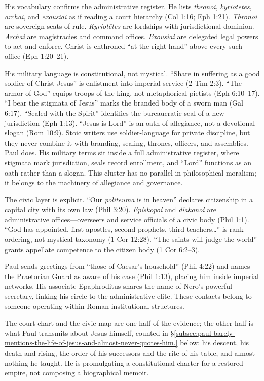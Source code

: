 His vocabulary confirms the administrative register.
He lists \textit{thronoi}, \textit{kyriotētes}, \textit{archai}, and \textit{exousiai} as if reading a court hierarchy (Col 1:16; Eph 1:21).
\textit{Thronoi} are sovereign seats of rule.
\textit{Kyriotētes} are lordships with jurisdictional dominion.
\textit{Archai} are magistracies and command offices.
\textit{Exousiai} are delegated legal powers to act and enforce.
Christ is enthroned ``at the right hand'' above every such office (Eph 1:20--21).

His military language is constitutional, not mystical.
``Share in suffering as a good soldier of Christ Jesus'' is enlistment into imperial service (2 Tim 2:3).
``The armor of God'' equips troops of the king, not metaphorical pietists (Eph 6:10--17).
``I bear the stigmata of Jesus'' marks the branded body of a sworn man (Gal 6:17).
``Sealed with the Spirit'' identifies the bureaucratic seal of a new jurisdiction (Eph 1:13).
``Jesus is Lord'' is an oath of allegiance, not a devotional slogan (Rom 10:9).
Stoic writers use soldier-language for private discipline, but they never combine it with branding, sealing, thrones, officers, and assemblies.
Paul does.
His military terms sit inside a full administrative register, where stigmata mark jurisdiction, seals record enrollment, and ``Lord'' functions as an oath rather than a slogan.
This cluster has no parallel in philosophical moralism; it belongs to the machinery of allegiance and governance.

The civic layer is explicit.
``Our \textit{politeuma} is in heaven'' declares citizenship in a capital city with its own law (Phil 3:20).
\textit{Episkopoi} and \textit{diakonoi} are administrative offices---overseers and service officials of a civic body (Phil 1:1).
``God has appointed, first apostles, second prophets, third teachers\ldots'' is rank ordering, not mystical taxonomy (1 Cor 12:28).
``The saints will judge the world'' grants appellate competence to the citizen body (1 Cor 6:2--3).

Paul sends greetings from ``those of Caesar's household'' (Phil 4:22) and names the Praetorian Guard as aware of his case (Phil 1:13), placing him inside imperial networks.
His associate Epaphroditus shares the name of Nero's powerful secretary, linking his circle to the administrative elite.
These contacts belong to someone operating within Roman institutional structures.

The court chart and the civic map are one half of the evidence; the other half is what Paul transmits about Jesus himself, counted in §\ref{subsec:paul-barely-mentions-the-life-of-jesus-and-almost-never-quotes-him.} below: his descent, his death and rising, the order of his successors and the rite of his table, and almost nothing he taught.
He is promulgating a constitutional charter for a restored empire, not composing a biographical memoir.

